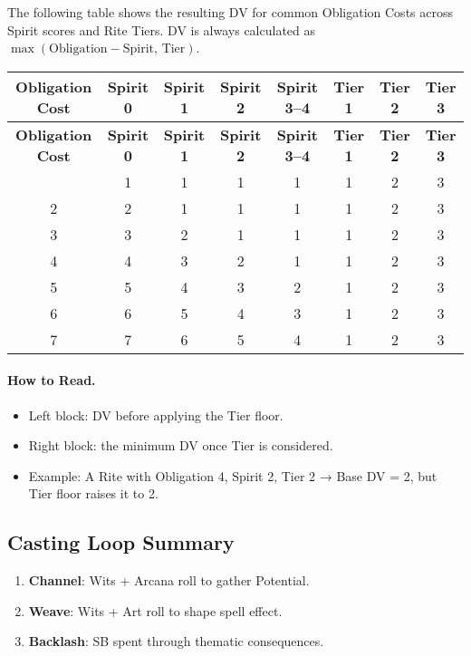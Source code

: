The following table shows the resulting DV for common Obligation Costs across Spirit scores and Rite Tiers.
DV is always calculated as $\max(\text{Obligation} - \text{Spirit}, \, \text{Tier})$.

\begin{longtable}{c|cccc|c|c|c}
\toprule
\textbf{Obligation Cost} & \textbf{Spirit 0} & \textbf{Spirit 1} & \textbf{Spirit 2} & \textbf{Spirit 3--4} & \textbf{Tier 1} & \textbf{Tier 2} & \textbf{Tier 3} \\
\midrule
\endfirsthead
\toprule
\textbf{Obligation Cost} & \textbf{Spirit 0} & \textbf{Spirit 1} & \textbf{Spirit 2} & \textbf{Spirit 3--4} & \textbf{Tier 1} & \textbf{Tier 2} & \textbf{Tier 3} \\
\midrule
\endhead
\bottomrule
\endfoot
\bottomrule
\endlastfoot
1 & 1 & 1 & 1 & 1 & 1 & 2 & 3 \\
2 & 2 & 1 & 1 & 1 & 1 & 2 & 3 \\
3 & 3 & 2 & 1 & 1 & 1 & 2 & 3 \\
4 & 4 & 3 & 2 & 1 & 1 & 2 & 3 \\
5 & 5 & 4 & 3 & 2 & 1 & 2 & 3 \\
6 & 6 & 5 & 4 & 3 & 1 & 2 & 3 \\
7 & 7 & 6 & 5 & 4 & 1 & 2 & 3 \\
\end{longtable}

\paragraph{How to Read.}
\begin{itemize}
  \item Left block: DV before applying the Tier floor.
  \item Right block: the minimum DV once Tier is considered.
  \item Example: A Rite with Obligation 4, Spirit 2, Tier 2 → Base DV = 2, but Tier floor raises it to 2.
\end{itemize}

\subsection{Casting Loop Summary}
\label{subsec:casting-loop-ref}

\begin{enumerate}
\item \textbf{Channel}: Wits + Arcana roll to gather Potential.
\item \textbf{Weave}: Wits + Art roll to shape spell effect.
\item \textbf{Backlash}: SB spent through thematic consequences.
\end{enumerate}

